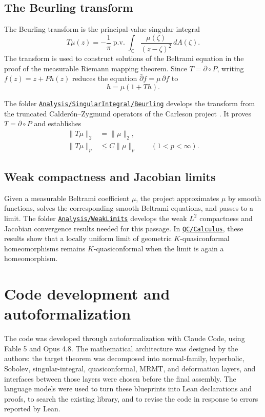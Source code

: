 \documentclass[letterpaper]{amsart}
\numberwithin{equation}{section}
\numberwithin{figure}{section}
\theoremstyle{plain}
\theoremstyle{definition}
\newcommand{\C}{\mathbb{C}}
\let\lean\nolinkurl
\newcommand{\leanfolder}[1]{\href{https://github.com/will1491/no-wandering-domains/tree/1a39faf/NoWanderingDomains/#1}{\lean{#1}}}
\begin{document}
\subsection{The Beurling transform}

The Beurling transform is the principal-value singular integral
\[
  T\mu(z)=-\frac{1}{\pi}\operatorname{p.v.}
    \int_{\C}\frac{\mu(\zeta)}{(z-\zeta)^2}\,dA(\zeta).
\]
The transform is used to construct solutions of the Beltrami equation in the proof of the measurable Riemann mapping theorem. Since $T=\partial\circ P$, writing $f(z)=z+Ph(z)$ reduces the equation $\bar\partial f=\mu\,\partial f$ to
\[
  h=\mu(1+Th).
\]

The folder \leanfolder{Analysis/SingularIntegral/Beurling} develops the transform from the truncated Calder\'on--Zygmund operators of the Carleson project \cite{Carleson}. It proves $T=\partial\circ P$ and establishes
\begin{align*}
  \|T\mu\|_2&=\|\mu\|_2,\\
  \|T\mu\|_p&\leq C\|\mu\|_p \qquad (1<p<\infty).
\end{align*}

\subsection{Weak compactness and Jacobian limits}

Given a measurable Beltrami coefficient $\mu$, the project approximates $\mu$ by smooth functions, solves the corresponding smooth Beltrami equations, and passes to a limit. The folder \leanfolder{Analysis/WeakLimits} develops the weak $L^2$ compactness and Jacobian convergence results needed for this passage. In \leanfolder{QC/Calculus}, these results show that a locally uniform limit of geometric $K$-quasiconformal homeomorphisms remains $K$-quasiconformal when the limit is again a homeomorphism.

\section{Code development and autoformalization}
\label{sec:development}

The code was developed through autoformalization with Claude Code, using Fable 5 and Opus 4.8. The mathematical architecture was designed by the authors: the target theorem was decomposed into normal-family, hyperbolic, Sobolev, singular-integral, quasiconformal, MRMT, and deformation layers, and interfaces between those layers were chosen before the final assembly. The language models were used to turn these blueprints into Lean declarations and proofs, to search the existing library, and to revise the code in response to errors reported by Lean.
\end{document}
